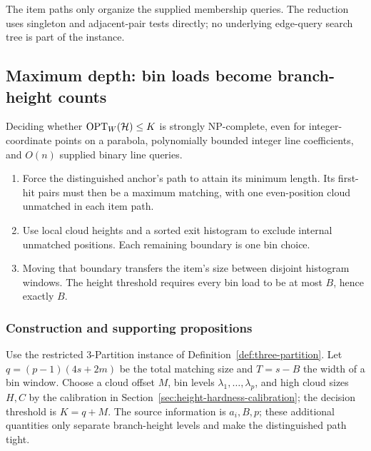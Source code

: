 The item paths only organize the supplied membership queries. The
reduction uses singleton and adjacent-pair tests directly; no
underlying edge-query search tree is part of the instance.

\subsection{Maximum depth: bin loads become branch-height counts}

\begin{theorem}
\label{thm:strong-worst}\label{thm:strong-height}
Deciding whether $\operatorname{OPT}_W(\mathcal H)\le K$ is strongly NP-complete,
even for integer-coordinate points on a parabola, polynomially bounded
integer line coefficients, and $O(n)$ supplied binary line queries.
\end{theorem}

\begin{proofstrategy}
\begin{enumerate}
\item Force the distinguished anchor's path to attain its minimum
length. Its first-hit pairs must then be a maximum matching, with
one even-position cloud unmatched in each item path.
\item Use local cloud heights and a sorted exit histogram to exclude
internal unmatched positions. Each remaining boundary is one bin choice.
\item Moving that boundary transfers the item's size between disjoint
histogram windows. The height threshold requires every bin load to be
at most $B$, hence exactly $B$.
\end{enumerate}
\end{proofstrategy}

\subsubsection{Construction and supporting propositions}

Use the restricted 3-Partition instance of Definition~\ref{def:three-partition}.
Let $q=(p-1)(4s+2m)$ be the total matching size and $T=s-B$ the
width of a bin window. Choose a cloud offset $M$, bin levels
$\lambda_1,\ldots,\lambda_p$, and high cloud sizes $H,C$ by the
calibration in Section~\ref{sec:height-hardness-calibration}; the
decision threshold is $K=q+M$.
The source information is $a_i,B,p$; these additional quantities only
separate branch-height levels and make the distinguished path tight.

